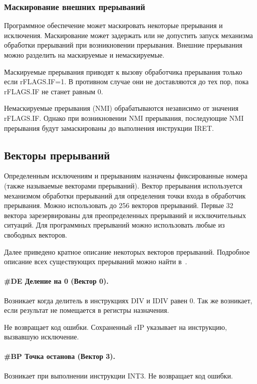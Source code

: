 \subsubsection*{Маскирование внешних прерываний}
Программное обеспечение может маскировать некоторые прерывания и исключения.
Маскирование может задержать или не допустить запуск механизма обработки
прерываний при возникновении прерывания. Внешние прерывания можно разделить на
маскируемые и немаскируемые.

Маскируемые прерывания приводят к вызову обработчика прерывания только если
rFLAGS.IF=1. В противном случае они не доставляются до тех пор, пока rFLAGS.IF
не станет равным 0.

Немаскируемые прерывания (NMI) обрабатываются независимо от значения rFLAGS.IF.
Однако при возникновении NMI прерывания, последующие NMI прерывания будут
замаскированы до выполнения инструкции IRET.

\subsection{Векторы прерываний}
Определенным исключениям и прерываниям назначены фиксированные номера (также
называемые векторами прерываний). Вектор прерывания используется механизмом обработки
прерываний для определения точки входа в обработчик прерывания. Можно использовать до
256 векторов прерываний. Первые 32 вектора зарезервированы для преопределенных прерываний
и исключительных ситуаций. Для программных прерываний можно использовать любые из
свободных векторов.

Далее приведено кратное описание некоторых векторов прерываний.
Подробное описание всех существующих прерываний можно найти в~\cite{amd_pm_v2}.

\paragraph{\#DE Деление на 0 (Вектор 0).}
Возникает когда делитель в инструкциях DIV и IDIV равен 0. Так же возникает,
если результат не помещается в регистры назначения.

Не возвращает код ошибки. Сохраненный rIP указывает на инструкцию, вызвавшую
исключение.

\paragraph{\#BP Точка останова (Вектор 3).}
Возникает при выполнении инструкции INT3. Не возвращает код ошибки.

